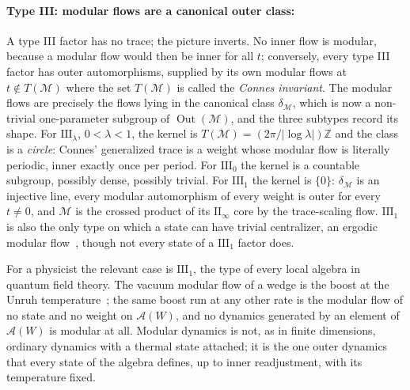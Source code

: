 \documentclass[a4paper,11pt]{article}
\theoremstyle{definition}
\begin{document}
\paragraph{Type III: modular flows are a canonical outer class:}
A type III factor has no trace; the picture inverts. No inner flow is modular, because a modular flow would then be inner for all $t$; conversely, every type III factor has outer automorphisms, supplied by its own modular flows at $t\notin T(\mathcal M)$ where the set $T(\mathcal M)$ is called the {\it Connes invariant}. The modular flows are precisely the flows lying in the canonical class $\delta_{\mathcal M}$, which is now a non-trivial one-parameter subgroup of $\operatorname{Out}(\mathcal M)$, and the three subtypes record its shape. For $\mathrm{III}_\lambda$, $0<\lambda<1$, the kernel is $T(\mathcal M)=(2\pi/|\log\lambda|)\mathbb Z$ and the class is a \emph{circle}: Connes' generalized trace is a weight whose modular flow is literally periodic, inner exactly once per period. For $\mathrm{III}_0$ the kernel is a countable subgroup, possibly dense, possibly trivial. For $\mathrm{III}_1$ the kernel is $\{0\}$: $\delta_{\mathcal M}$ is an injective line, every modular automorphism of every weight is outer for every $t\ne0$, and $\mathcal M$ is the crossed product of its $\mathrm{II}_\infty$ core by the trace-scaling flow. $\mathrm{III}_1$ is also the only type on which a state can have trivial centralizer, an ergodic modular flow~\cite{Connes1973,Longo1982}, though not every state of a $\mathrm{III}_1$ factor does.

For a physicist the relevant case is $\mathrm{III}_1$, the type of every local algebra in quantum field theory. The vacuum modular flow of a wedge is the boost at the Unruh temperature~\cite{BisognanoWichmann1975}; the same boost run at any other rate is the modular flow of no state and no weight on $\mathcal A(W)$, and no dynamics generated by an element of $\mathcal A(W)$ is modular at all. Modular dynamics is not, as in finite dimensions, ordinary dynamics with a thermal state attached; it is the one outer dynamics that every state of the algebra defines, up to inner readjustment, with its temperature fixed. 

\end{document}
